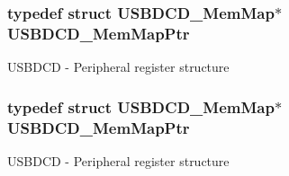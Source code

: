 \subsubsection[{\texorpdfstring{U\+S\+B\+D\+C\+D\+\_\+\+Mem\+Map\+Ptr}{USBDCD_MemMapPtr}}]{\setlength{\rightskip}{0pt plus 5cm}typedef struct {\bf U\+S\+B\+D\+C\+D\+\_\+\+Mem\+Map}$\ast$ {\bf U\+S\+B\+D\+C\+D\+\_\+\+Mem\+Map\+Ptr}}\hypertarget{group___u_s_b_d_c_d___peripheral_gad6e68bd3ca7f14168c34ff5e824dd321}{}\label{group___u_s_b_d_c_d___peripheral_gad6e68bd3ca7f14168c34ff5e824dd321}
U\+S\+B\+D\+CD -\/ Peripheral register structure 
\subsubsection[{\texorpdfstring{U\+S\+B\+D\+C\+D\+\_\+\+Mem\+Map\+Ptr}{USBDCD_MemMapPtr}}]{\setlength{\rightskip}{0pt plus 5cm}typedef struct {\bf U\+S\+B\+D\+C\+D\+\_\+\+Mem\+Map}$\ast$ {\bf U\+S\+B\+D\+C\+D\+\_\+\+Mem\+Map\+Ptr}}\hypertarget{group___u_s_b_d_c_d___peripheral_gad6e68bd3ca7f14168c34ff5e824dd321}{}\label{group___u_s_b_d_c_d___peripheral_gad6e68bd3ca7f14168c34ff5e824dd321}
U\+S\+B\+D\+CD -\/ Peripheral register structure 